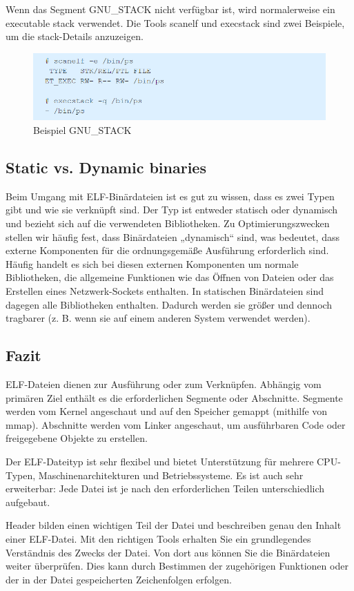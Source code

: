 Wenn das Segment GNU\_STACK nicht verfügbar ist, wird normalerweise ein executable stack verwendet.
Die Tools scanelf und execstack sind zwei Beispiele, um die stack-Details anzuzeigen.

\begin{figure}[H]
    \begin{center}
        \includegraphics[scale=1]{images/example_gnustack.png}
        \caption{Beispiel GNU\_STACK \cite{example_gnustack}}
    \end{center}
\end{figure}

\subsection{Static vs. Dynamic binaries}
Beim Umgang mit ELF-Binärdateien ist es gut zu wissen, dass es zwei Typen gibt und wie sie verknüpft sind. Der Typ ist entweder statisch oder dynamisch und bezieht sich auf die verwendeten Bibliotheken. Zu Optimierungszwecken stellen wir häufig fest, dass Binärdateien „dynamisch“ sind, was bedeutet, dass externe Komponenten für die ordnungsgemäße Ausführung erforderlich sind. Häufig handelt es sich bei diesen externen Komponenten um normale Bibliotheken, die allgemeine Funktionen wie das Öffnen von Dateien oder das Erstellen eines Netzwerk-Sockets enthalten. In statischen Binärdateien sind dagegen alle Bibliotheken enthalten. Dadurch werden sie größer und dennoch tragbarer (z. B. wenn sie auf einem anderen System verwendet werden).

\subsection{Fazit}
ELF-Dateien dienen zur Ausführung oder zum Verknüpfen. Abhängig vom primären Ziel enthält es die erforderlichen Segmente oder Abschnitte. Segmente werden vom Kernel angeschaut und auf den Speicher gemappt (mithilfe von mmap). Abschnitte werden vom Linker angeschaut, um ausführbaren Code oder freigegebene Objekte zu erstellen.

Der ELF-Dateityp ist sehr flexibel und bietet Unterstützung für mehrere CPU-Typen, Maschinenarchitekturen und Betriebssysteme. Es ist auch sehr erweiterbar: Jede Datei ist je nach den erforderlichen Teilen unterschiedlich aufgebaut.

Header bilden einen wichtigen Teil der Datei und beschreiben genau den Inhalt einer ELF-Datei. Mit den richtigen Tools erhalten Sie ein grundlegendes Verständnis des Zwecks der Datei. Von dort aus können Sie die Binärdateien weiter überprüfen. Dies kann durch Bestimmen der zugehörigen Funktionen oder der in der Datei gespeicherten Zeichenfolgen erfolgen.\cite{elf_linux_audit}